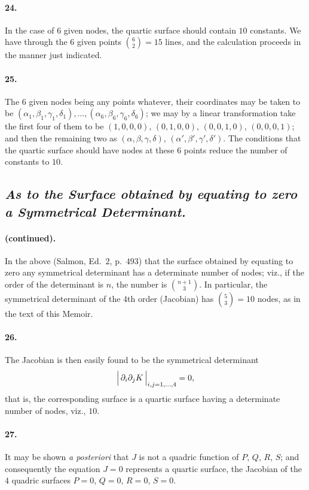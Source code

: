 \documentclass[11pt,a4paper]{article}
\begin{document}
\paragraph{24.}
In the case of $6$ given nodes, the quartic surface should contain $10$ constants. We
have through the $6$ given points $\binom{6}{2} = 15$ lines, and the calculation
proceeds in the manner just indicated.

\paragraph{25.}
The $6$ given nodes being any points whatever, their coordinates may be taken to be
$(\alpha_1, \beta_1, \gamma_1, \delta_1), \ldots, (\alpha_6, \beta_6, \gamma_6, \delta_6)$;
we may by a linear transformation take the first four of them to be $(1, 0, 0, 0)$,
$(0, 1, 0, 0)$, $(0, 0, 1, 0)$, $(0, 0, 0, 1)$; and then the remaining two as
$(\alpha, \beta, \gamma, \delta)$, $(\alpha', \beta', \gamma', \delta')$. The conditions
that the quartic surface should have nodes at these $6$ points reduce the number of
constants to $10$.

\bigskip

\subsection*{\textit{As to the Surface obtained by equating to zero a Symmetrical Determinant.}}

\paragraph{(continued).}
In the above (Salmon, Ed.\ $2$, p.\ $493$) that the surface obtained by equating to zero
any symmetrical determinant has a determinate number of nodes; viz., if the order of the
determinant is $n$, the number is $\binom{n+1}{3}$. In particular, the symmetrical
determinant of the $4$th order (Jacobian) has $\binom{5}{3} = 10$ nodes, as in the text
of this Memoir.

\paragraph{26.}
The Jacobian is then easily found to be the symmetrical determinant
\[
\Bigl|\,\partial_i \partial_j K\,\Bigr|_{i,j=1,\ldots,4} = 0,
\]
that is, the corresponding surface is a quartic surface having a determinate number of
nodes, viz., $10$.

\paragraph{27.}
It may be shown \textit{a posteriori} that $J$ is not a quadric function of $P$, $Q$, $R$,
$S$; and consequently the equation $J = 0$ represents a quartic surface, the Jacobian of
the $4$ quadric surfaces $P = 0$, $Q = 0$, $R = 0$, $S = 0$.
\end{document}
